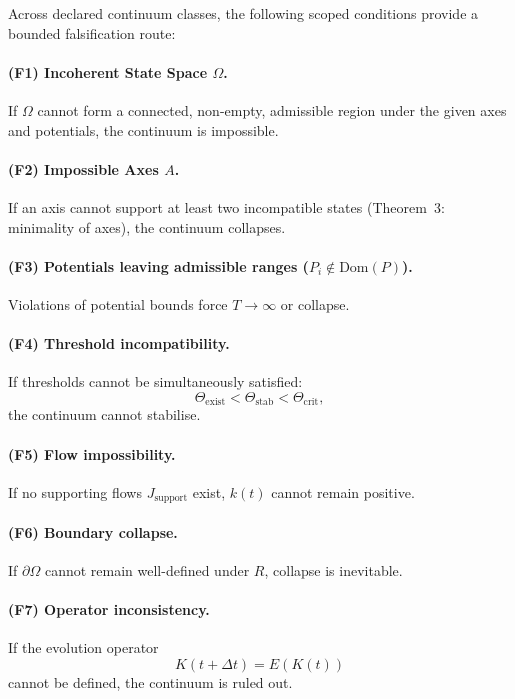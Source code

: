 Across declared continuum classes, the following scoped conditions provide
a bounded falsification route:

\paragraph{(F1) Incoherent State Space \texorpdfstring{$\Omega$}{\Omega}.}  
If $\Omega$ cannot form a connected, non-empty, admissible region under
the given axes and potentials, the continuum is impossible.

\paragraph{(F2) Impossible Axes \texorpdfstring{$A$}{A}.}  
If an axis cannot support at least two incompatible states 
(Theorem~3: minimality of axes), the continuum collapses.

\paragraph{(F3) Potentials leaving admissible ranges ($P_i \notin \mathrm{Dom}(P)$).}  
Violations of potential bounds force $T \to \infty$ or collapse.

\paragraph{(F4) Threshold incompatibility.}  
If thresholds cannot be simultaneously satisfied:
\[
\Theta_{\mathrm{exist}} < \Theta_{\mathrm{stab}} < \Theta_{\mathrm{crit}},
\]
the continuum cannot stabilise.

\paragraph{(F5) Flow impossibility.}  
If no supporting flows $J_{\mathrm{support}}$ exist, $k(t)$ cannot
remain positive.

\paragraph{(F6) Boundary collapse.}  
If $\partial\Omega$ cannot remain well-defined under $R$,
collapse is inevitable.

\paragraph{(F7) Operator inconsistency.}  
If the evolution operator 
\[
K(t+\Delta t) = E(K(t))
\]
cannot be defined, the continuum is ruled out.

